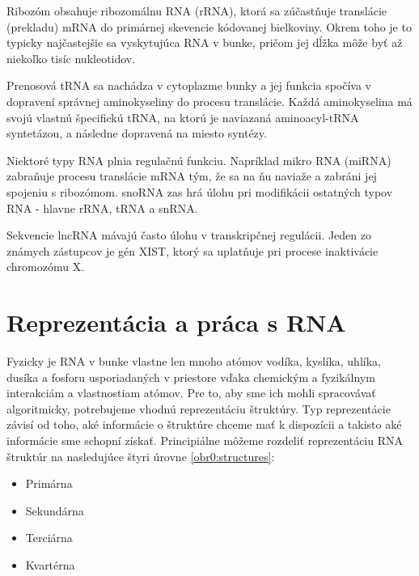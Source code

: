 \indent Ribozóm obsahuje ribozomálnu RNA (rRNA), ktorá sa zúčastňuje translácie (prekladu) mRNA do primárnej skevencie kódovanej bielkoviny. Okrem toho je to typicky najčastejšie sa vyskytujúca RNA v bunke, pričom jej dĺžka môže byť až niekoľko tisíc nukleotidov.


\indent Prenosová tRNA sa nachádza v cytoplazme bunky a jej funkcia spočíva v dopravení správnej aminokyseliny do procesu translácie. Každá aminokyselina má svojú vlastnú špecifickú tRNA, na ktorú je naviazaná aminoacyl-tRNA syntetázou, a následne dopravená na miesto syntézy.


\indent  Niektoré typy RNA plnia regulačnú funkciu. Napríklad mikro RNA (miRNA) zabraňuje procesu translácie mRNA tým, že sa na ňu naviaže a zabráni jej spojeniu s ribozómom. snoRNA zas hrá úlohu pri modifikácii ostatných typov RNA - hlavne rRNA, tRNA a snRNA.


\indent Sekvencie lncRNA mávajú často úlohu v transkripčnej regulácii. Jeden zo známych zástupcov je gén XIST, ktorý sa uplatňuje pri procese inaktivácie chromozómu X. \cite{Rinn12}


\section{Reprezentácia a práca s RNA}
Fyzicky je RNA v bunke vlastne len mnoho atómov vodíka, kyslíka, uhlíka, dusíka a fosforu usporiadaných v priestore vďaka chemickým a fyzikálnym interakciám a vlastnostiam atómov. Pre to, aby sme ich mohli spracovávať algoritmicky, potrebujeme vhodnú reprezentáciu štruktúry.
Typ reprezentácie závisí od toho, aké informácie o štruktúre chceme mať k dispozícii a takisto aké informácie sme schopní získať. Principiálne môžeme rozdeliť reprezentáciu RNA štruktúr na nasledujúce štyri úrovne \autoref{obr0:structures}:

\begin{itemize}
\item Primárna
\item Sekundárna
\item Terciárna
\item Kvartérna
\end{itemize}

